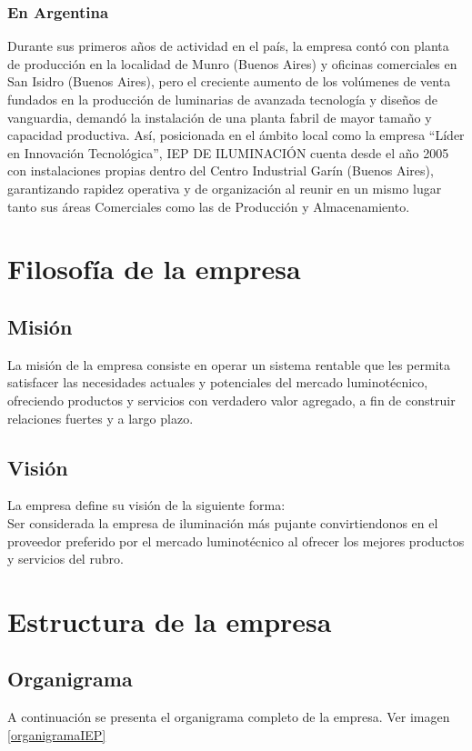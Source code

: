 \subsubsection{En Argentina}
Durante sus primeros años de actividad en el país, la empresa contó con planta de producción en la localidad de Munro (Buenos Aires) y oficinas comerciales en San Isidro (Buenos Aires), pero el creciente aumento de los volúmenes de venta fundados en la producción de luminarias de avanzada tecnología y diseños de vanguardia, demandó la instalación de una planta fabril de mayor tamaño y capacidad productiva.
Así, posicionada en el ámbito local como la empresa “Líder en Innovación Tecnológica”, IEP DE ILUMINACIÓN cuenta desde el año 2005 con instalaciones propias dentro del Centro Industrial Garín (Buenos Aires), garantizando rapidez operativa y de organización al reunir en un mismo lugar tanto sus áreas Comerciales como las de Producción y Almacenamiento.

\section{Filosof\'ia de la empresa}

\subsection{Misi\'on}

La misi\'on de la empresa consiste en operar un sistema rentable que les permita satisfacer las necesidades actuales y potenciales del mercado luminot\'ecnico, 
ofreciendo productos y servicios con verdadero valor agregado, a fin de construir relaciones fuertes y a largo plazo.

\subsection{Visi\'on}

La empresa define su visi\'on de la siguiente forma:\\
Ser considerada la empresa de iluminaci\'on m\'as pujante convirtiendonos en el proveedor preferido por el mercado luminot\'ecnico al ofrecer los mejores 
productos y servicios del rubro.
 
\section{Estructura de la empresa}

\subsection{Organigrama}
A continuación se presenta el organigrama completo de la empresa. Ver imagen \ref{organigramaIEP}


